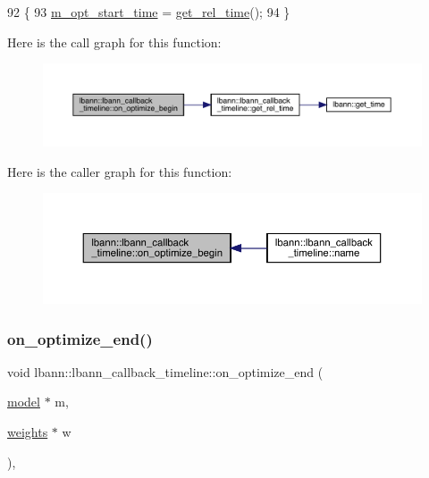 \begin{DoxyCode}
92                                                                     \{
93   \hyperlink{classlbann_1_1lbann__callback__timeline_a9f16bbedce47953a28e63b52d92792c3}{m\_opt\_start\_time} = \hyperlink{classlbann_1_1lbann__callback__timeline_a67da1376356bf2153ab67489014e0ad4}{get\_rel\_time}();
94 \}
\end{DoxyCode}
Here is the call graph for this function\+:\nopagebreak
\begin{figure}[H]
\begin{center}
\leavevmode
\includegraphics[width=350pt]{classlbann_1_1lbann__callback__timeline_a2037300798c70d831845c7efaf5de6c2_cgraph}
\end{center}
\end{figure}
Here is the caller graph for this function\+:\nopagebreak
\begin{figure}[H]
\begin{center}
\leavevmode
\includegraphics[width=350pt]{classlbann_1_1lbann__callback__timeline_a2037300798c70d831845c7efaf5de6c2_icgraph}
\end{center}
\end{figure}
\mbox{\label{classlbann_1_1lbann__callback__timeline_afdf506e2c2d40c7b0d1f845fb0ed077e}} 
\subsubsection{\texorpdfstring{on\+\_\+optimize\+\_\+end()}{on\_optimize\_end()}}
{\footnotesize\ttfamily void lbann\+::lbann\+\_\+callback\+\_\+timeline\+::on\+\_\+optimize\+\_\+end (\begin{DoxyParamCaption}\item[{\hyperlink{classlbann_1_1model}{model} $\ast$}]{m,  }\item[{\hyperlink{classlbann_1_1weights}{weights} $\ast$}]{w }\end{DoxyParamCaption})\hspace{0.3cm}{\ttfamily [override]}, {\ttfamily [virtual]}}

